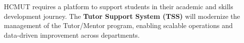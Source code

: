 HCMUT requires a platform to support students in their academic and skills development journey.
The \textbf{Tutor Support System (TSS)} will modernize the management of the Tutor/Mentor program,
enabling scalable operations and data-driven improvement across departments.
